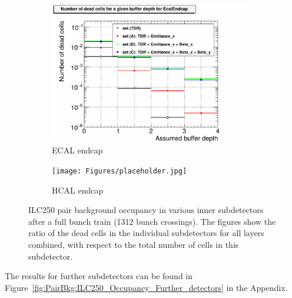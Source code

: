 \begin{figure}
\begin{subfigure}[b]{0.49\textwidth}
   \centering
    \includegraphics[width=\textwidth]{Figures/Pairs/Appendix/Occupancy_Comparison_All_layers_deadcells_ILC250_ALL_SETS_ECALEndcap.pdf}
   \caption{\sid ECAL endcap}
   \end{subfigure}
   \hfill
    \begin{subfigure}[b]{0.49\textwidth}
   \centering
    \texttt{[image: Figures/placeholder.jpg]}
   \caption{\sid HCAL endcap}
   \end{subfigure}
   \caption[Pair background occupancy in various inner \sid subdetectors for the ILC250]{ILC250 pair background occupancy in various inner \sid subdetectors after a full bunch train (1312 bunch crossings).
   The figures show the ratio of the dead cells in the individual subdetectors for all layers combined, with respect to the total number of cells in this subdetector.
   }
   \label{fig:PairBkg:ILC250_Occupancy_Inner_detectors}
\end{figure}
The results for further subdetectors can be found in Figure~\ref{fig:PairBkg:ILC250_Occupancy_Further_detectors} in the Appendix.

